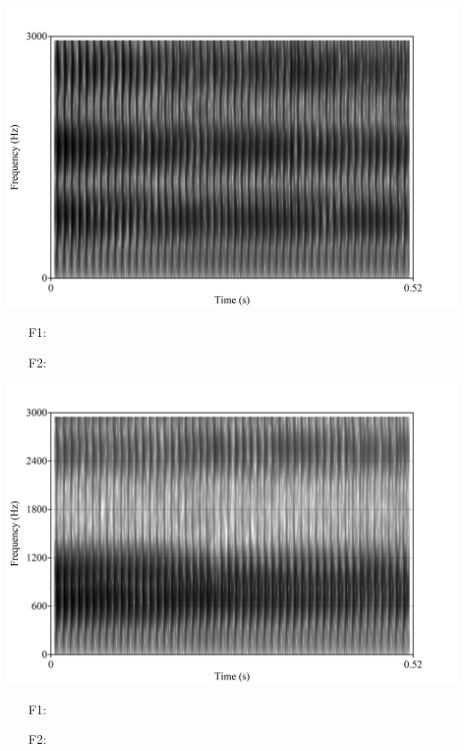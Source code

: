 \documentclass[addpoints]{exam}
\begin{document}
\begin{questions}
      \newpage
      \question[1]
        \begin{minipage}{0.45\linewidth}
          \includegraphics[scale=0.6]{vowel5.jpg}
        \end{minipage}\hspace{0.1\linewidth}
        \begin{minipage}{0.45\linewidth}
          \begin{itemize}
            \item[F1:] \hrulefill
            \item[F2:] \hrulefill
          \end{itemize}
        \end{minipage}
      \question[1]
        \begin{minipage}{0.45\linewidth}
          \includegraphics[scale=0.6]{vowel6.jpg}
        \end{minipage}\hspace{0.1\linewidth}
        \begin{minipage}{0.45\linewidth}
          \begin{itemize}
            \item[F1:] \hrulefill
            \item[F2:] \hrulefill
          \end{itemize}
        \end{minipage}
  \end{questions}

  \vspace{1.25cm}

  \begin{center}
    \gradetable[v][pages]
  \end{center}
\end{document}
